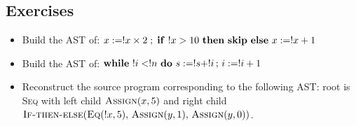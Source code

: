 \subsection{Exercises}
\begin{itemize}
  \item Build the AST of:
  $x := !x \times 2\;;\;\mathbf{if}\ !x>10\ \mathbf{then}\ \mathbf{skip}\ \mathbf{else}\ x := !x+1$
  \item Build the AST of:
  $\mathbf{while}\ !i<!n\ \mathbf{do}\ s := !s+!i \,;\, i := !i+1$
  \item Reconstruct the source program corresponding to the following AST: root is \textsc{Seq} with left child $\textsc{Assign}(x, 5)$ and right child $\textsc{If-then-else}(\textsc{Eq}(!x,5),\,\textsc{Assign}(y,1),\, \textsc{Assign}(y,0))$.
\end{itemize}
 



